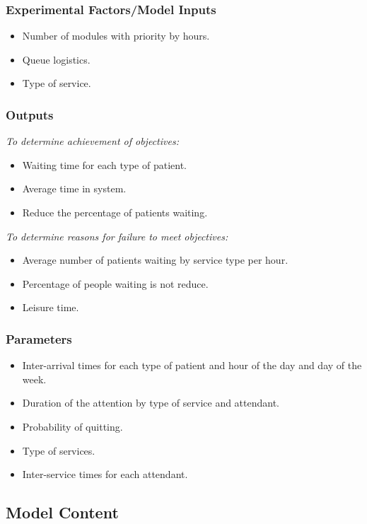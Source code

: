 \subsubsection{Experimental Factors/Model Inputs}
\begin{itemize}
\item Number of modules with priority by hours.
\item Queue logistics.
\item Type of service.
\end{itemize}

\subsubsection{Outputs}
\textit{To determine achievement of objectives:}
\begin{itemize}
    \item Waiting time for each type of patient.
    \item Average time in system.
    \item  Reduce the percentage of patients waiting.
\end{itemize}


\textit{To determine reasons for failure to meet objectives:}
\begin{itemize}
    \item Average number of patients waiting by service type per hour.
    \item  Percentage of people waiting is not reduce.
    \item Leisure time.
\end{itemize}

\subsubsection{Parameters}
\begin{itemize}
\item Inter-arrival times for each type of patient and hour of the day and day of the week.
\item Duration of the attention by type of service and attendant.
\item Probability of quitting.
\item Type of services.
\item Inter-service times for each attendant.
\end{itemize}

\subsection{Model Content}
